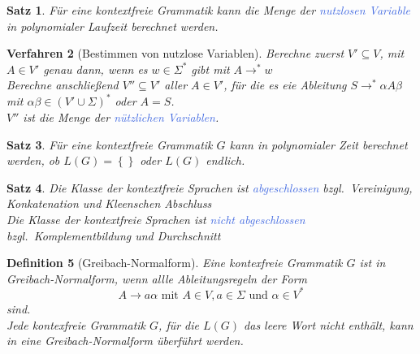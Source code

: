 \documentclass[11pt]{article}
\newcommand{\tcol}[1]{\textcolor{RoyalBlue}{#1}}
\newcommand{\set}[1]{\left\lbrace #1\right\rbrace}
\theoremstyle{break}
\newtheorem{satz}{Satz}[section]
\newtheorem{defi}[satz]{Definition}
\newtheorem{verf}[satz]{Verfahren}
\begin{document}
    \begin{satz}
        Für eine kontextfreie Grammatik kann die Menge der \tcol{nutzlosen Variable} in polynomialer Laufzeit berechnet werden.
    \end{satz}

    \begin{verf}[Bestimmen von nutzlose Variablen]
        Berechne zuerst $V'\subseteq V$, mit $A\in V'$ genau dann, wenn es $w\in\Sigma^*$ gibt mit $A\rightarrow^*w$\\
        Berechne anschließend $V''\subseteq V'$ aller $A\in V'$, für die es eie Ableitung $S\rightarrow^*\alpha A\beta$ mit $\alpha\beta\in(V'\cup\Sigma)^*$ oder $A=S$.\\
        $V''$ ist die Menge der \tcol{nützlichen Variablen}.
    \end{verf}

    \begin{satz}
        Für eine kontextfreie Grammatik $G$ kann in polynomialer Zeit berechnet werden, ob $L(G)=\set{}$ oder $L(G)$ endlich.
    \end{satz}

    \begin{satz}
        Die Klasse der kontextfreie Sprachen ist \tcol{abgeschlossen} bzgl.\ Vereinigung, Konkatenation und Kleenschen Abschluss\\
        Die Klasse der kontextfreie Sprachen ist \tcol{nicht abgeschlossen} bzgl.\ Komplementbildung und Durchschnitt\\
    \end{satz}

    \begin{defi}[Greibach-Normalform]
        Eine kontexfreie Grammatik $G$ ist in Greibach-Normalform, wenn allle Ableitungsregeln der Form
        \[A\rightarrow a\alpha\text{ mit }A\in V,a\in\Sigma\text{ und }\alpha\in V^*\]
        sind.\\
        Jede kontexfreie Grammatik $G$, für die $L(G)$ das leere Wort nicht enthält, kann in eine Greibach-Normalform überführt werden.
    \end{defi}

\end{document}
